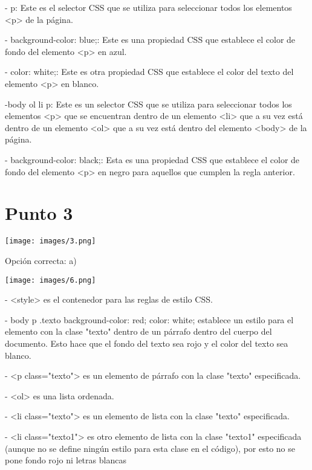 \documentclass[journal, spanish]{IEEEtran}
\begin{document}
- p: Este es el selector CSS que se utiliza para seleccionar todos los elementos <p> de la página.

- background-color: blue;: Este es una propiedad CSS que establece el color de fondo del elemento <p> en azul.

- color: white;: Este es otra propiedad CSS que establece el color del texto del elemento <p> en blanco.

-body ol li p: Este es un selector CSS que se utiliza para seleccionar todos los elementos <p> que se encuentran dentro de un elemento <li> que a su vez está dentro de un elemento <ol> que a su vez está dentro del elemento <body> de la página.

- background-color: black;: Esta es una propiedad CSS que establece el color de fondo del elemento <p> en negro para aquellos que cumplen la regla anterior.

\section{Punto 3}
\begin{center}
\texttt{[image: images/3.png]}
  \end{center}
Opción correcta:
a) \begin{center}
  \texttt{[image: images/6.png]}
  \end{center}
  
- <style> es el contenedor para las reglas de estilo CSS.

- body p .texto {background-color: red; color: white;} establece un estilo para el elemento con la clase "texto" dentro de un párrafo dentro del cuerpo del documento. Esto hace que el fondo del texto sea rojo y el color del texto sea blanco.

- <p class="texto"> es un elemento de párrafo con la clase "texto" especificada.

- <ol> es una lista ordenada.

- <li class="texto"> es un elemento de lista con la clase "texto"  especificada.

- <li class="texto1"> es otro elemento de lista con la clase "texto1" especificada (aunque no se define ningún estilo para esta clase en el código), por esto no se pone fondo rojo ni letras blancas

\vspace{12pt}
\end{document}
